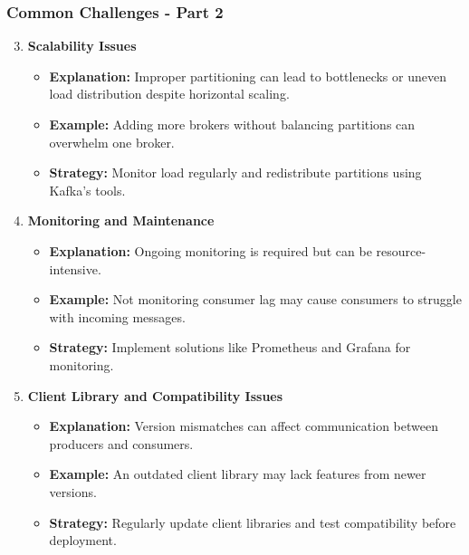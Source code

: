 \documentclass[aspectratio=169]{beamer}
\begin{document}
\begin{frame}[fragile]
    \frametitle{Common Challenges - Part 2}
    \begin{enumerate}
        \setcounter{enumi}{2}
        \item \textbf{Scalability Issues}
        \begin{itemize}
            \item \textbf{Explanation:} Improper partitioning can lead to bottlenecks or uneven load distribution despite horizontal scaling.
            \item \textbf{Example:} Adding more brokers without balancing partitions can overwhelm one broker.
            \item \textbf{Strategy:} Monitor load regularly and redistribute partitions using Kafka's tools.
        \end{itemize}

        \item \textbf{Monitoring and Maintenance}
        \begin{itemize}
            \item \textbf{Explanation:} Ongoing monitoring is required but can be resource-intensive.
            \item \textbf{Example:} Not monitoring consumer lag may cause consumers to struggle with incoming messages.
            \item \textbf{Strategy:} Implement solutions like Prometheus and Grafana for monitoring.
        \end{itemize}

        \item \textbf{Client Library and Compatibility Issues}
        \begin{itemize}
            \item \textbf{Explanation:} Version mismatches can affect communication between producers and consumers.
            \item \textbf{Example:} An outdated client library may lack features from newer versions.
            \item \textbf{Strategy:} Regularly update client libraries and test compatibility before deployment.
        \end{itemize}
    \end{enumerate}
\end{frame}
\end{document}
